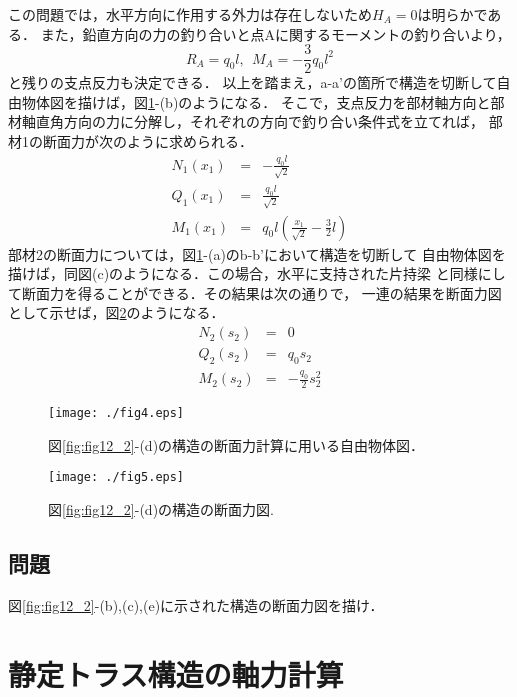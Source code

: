 \documentclass[10pt,a4j]{jbook}
\begin{document}
この問題では，水平方向に作用する外力は存在しないため$H_A=0$は明らかである．
また，鉛直方向の力の釣り合いと点Aに関するモーメントの釣り合いより，
\begin{equation}
	R_A=q_0l, \ \ M_A=-\frac{3}{2}q_0l^2
\end{equation}
と残りの支点反力も決定できる．
以上を踏まえ，a-a'の箇所で構造を切断して自由物体図を描けば，図\ref{fig:fig12_4}-(b)のようになる．
そこで，支点反力を部材軸方向と部材軸直角方向の力に分解し，それぞれの方向で釣り合い条件式を立てれば，
部材1の断面力が次のように求められる．
\begin{eqnarray}
	N_1(x_1) &= & -\frac{q_0l}{\sqrt{2}} 
	\\
	Q_1(x_1) &= & \frac{q_0l}{\sqrt{2}} 
	\\
	M_1(x_1) &= & q_0l \left( \frac{x_1}{\sqrt{2}}-\frac{3}{2}l\right) 
\end{eqnarray}
部材2の断面力については，図\ref{fig:fig12_4}-(a)のb-b'において構造を切断して
自由物体図を描けば，同図(c)のようになる．この場合，水平に支持された片持梁
と同様にして断面力を得ることができる．その結果は次の通りで，
一連の結果を断面力図として示せば，図\ref{fig:fig12_5}のようになる．
\begin{eqnarray}
	N_2(s_2) &= & 0
	\\
	Q_2(s_2) &= & q_0s_2
	\\
	M_2(s_2) &= & -\frac{q_0}{2}s_2^2
\end{eqnarray}
\begin{figure}[h]
	\begin{center}
	\texttt{[image: ./fig4.eps]} 
	\end{center}
	\caption{
		図\ref{fig:fig12_2}-(d)の構造の断面力計算に用いる自由物体図．
	} 
	\label{fig:fig12_4}
\end{figure}
\begin{figure}[h]
	\begin{center}
	\texttt{[image: ./fig5.eps]} 
	\end{center}
	\caption{
		図\ref{fig:fig12_2}-(d)の構造の断面力図.
	} 
	\label{fig:fig12_5}
\end{figure}
\subsection{問題}
図\ref{fig:fig12_2}-(b),(c),(e)に示された構造の断面力図を描け．
\section{静定トラス構造の軸力計算}
\end{document}
